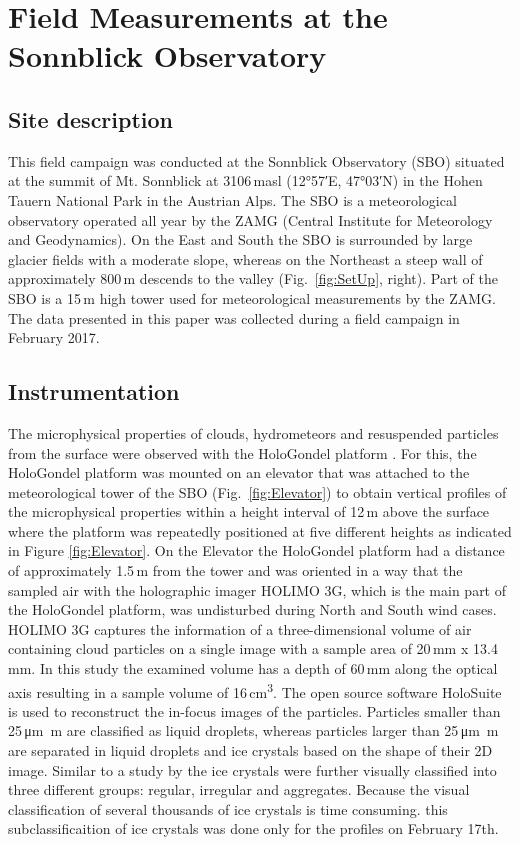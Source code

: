 \documentclass[draft,linenumbers]{agujournal}
\begin{document}
\section{Field Measurements at the Sonnblick Observatory}
\label{sectionMeasurementSite}

\subsection{Site description}

This field campaign was conducted at the Sonnblick Observatory (SBO) situated at the summit of Mt. Sonnblick at 3106\,\si{masl} (\ang{12;57;}E, \ang{47;03;}N) in the Hohen Tauern National Park in the Austrian Alps. The SBO is a meteorological observatory operated all year by the ZAMG (Central Institute for Meteorology and Geodynamics). On the East and South the SBO is surrounded by large glacier fields with a moderate slope, whereas on the Northeast a steep wall of approximately 800\,\si{m} descends to the valley (Fig.~\ref{fig:SetUp}, right). Part of the SBO is a 15\,\si{m} high tower used for meteorological measurements by the ZAMG. The data presented in this paper was collected during a field campaign in February 2017. 

\subsection{Instrumentation}
The microphysical properties of clouds, hydrometeors and resuspended particles from the surface were observed with the HoloGondel platform \citep{bec17}. For this, the HoloGondel platform was mounted on an elevator that was attached to the meteorological tower of the SBO (Fig.~\ref{fig:Elevator}) to obtain vertical profiles of the microphysical properties within a height interval of 12\,\si{m} above the surface where the platform was repeatedly positioned at five different heights as indicated in Figure \ref{fig:Elevator}. On the Elevator the HoloGondel platform had a distance of approximately 1.5\,\si{m} from the tower and was oriented in a way that the sampled air with the holographic imager HOLIMO 3G, which is the main part of the HoloGondel platform, was undisturbed during North and South wind cases. HOLIMO 3G captures the information of a three-dimensional volume of air containing cloud particles on a single image with a sample area of 20\,\si{mm} x 13.4\,\si{mm}. In this study the examined volume has a depth of 60\,\si{mm} along the optical axis resulting in a sample volume of 16\,\si{cm^3}. The open source software HoloSuite \citep{Fug15} is used to reconstruct the in-focus images of the particles. Particles smaller than 25\,\si{\um m} are classified as liquid droplets, whereas particles larger than 25\,\si{\um m} are separated in liquid droplets and ice crystals based on the shape of their 2D image. Similar to a study by \cite{Sch17} the ice crystals were further visually classified into three different groups: regular, irregular and aggregates. Because the visual classification of several thousands of ice crystals is time consuming. this subclassificaition of ice crystals was done only for the profiles on February 17th.
\end{document}
